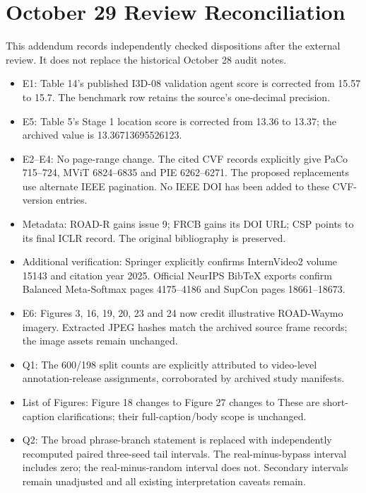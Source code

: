 \chapter*{October 29 Review Reconciliation}
This addendum records independently checked dispositions after the external review. It does not replace the historical October 28 audit notes.
\begin{itemize}
\item E1: Table 14's published I3D-08 validation agent score is corrected from 15.57 to 15.7. The benchmark row retains the source's one-decimal precision.
\item E5: Table 5's Stage 1 location score is corrected from 13.36 to 13.37; the archived value is 13.36713695526123.
\item E2--E4: No page-range change. The cited CVF records explicitly give PaCo 715--724, MViT 6824--6835 and PIE 6262--6271. The proposed replacements use alternate IEEE pagination. No IEEE DOI has been added to these CVF-version entries.
\item Metadata: ROAD-R gains issue 9; FRCB gains its DOI URL; CSP points to its final ICLR record. The original bibliography is preserved.
\item Additional verification: Springer explicitly confirms InternVideo2 volume 15143 and citation year 2025. Official NeurIPS BibTeX exports confirm Balanced Meta-Softmax pages 4175--4186 and SupCon pages 18661--18673.
\item E6: Figures 3, 16, 19, 20, 23 and 24 now credit illustrative ROAD-Waymo imagery. Extracted JPEG hashes match the archived source frame records; the image assets remain unchanged.
\item Q1: The 600/198 split counts are explicitly attributed to video-level annotation-release assignments, corroborated by archived study manifests.
\item List of Figures: Figure 18 changes  to  Figure 27 changes  to  These are short-caption clarifications; their full-caption/body scope is unchanged.
\item Q2: The broad phrase-branch statement is replaced with independently recomputed paired three-seed tail intervals. The real-minus-bypass interval includes zero; the real-minus-random interval does not. Secondary intervals remain unadjusted and all existing interpretation caveats remain.

\end{itemize}
